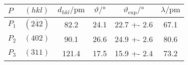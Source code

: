 \begin{tabular}{lcSSSS}
\toprule

{$P$} & {$(hkl)$} & {$d_{hkl} / \si{\pico\metre}$} & {$\vartheta / \si{\degree}$} & {$\vartheta_\mathrm{exp} / \si{\degree}$} & {$\lambda / \si{\pico\metre}$} \\

\midrule

$P_1$ & $(2\overline{4}2)$ & 82.2 & 24.1 & 22.7 +- 2.6 & 67.1\\
$P_2$ & $(402)$ & 90.1 & 26.6 & 24.9 +- 2.6 & 80.6\\
$P_3$ & $(311)$ & 121.4 & 17.5 & 15.9 +- 2.4 & 73.2\\

\bottomrule
\end{tabular}